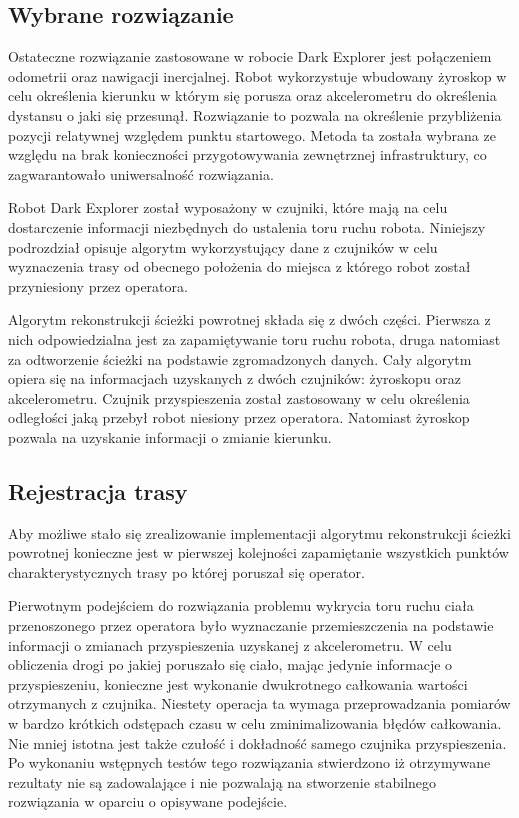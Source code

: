 \subsection{Wybrane rozwiązanie}
Ostateczne rozwiązanie zastosowane w robocie Dark Explorer jest połączeniem odometrii oraz nawigacji inercjalnej. Robot wykorzystuje wbudowany żyroskop w celu określenia kierunku w którym się porusza oraz akcelerometru do określenia dystansu o jaki się przesunął. Rozwiązanie to pozwala na określenie przybliżenia pozycji relatywnej względem punktu startowego. Metoda ta została wybrana ze względu na brak konieczności przygotowywania zewnętrznej infrastruktury, co zagwarantowało uniwersalność rozwiązania.

Robot Dark Explorer został wyposażony w czujniki, które mają na celu dostarczenie
informacji niezbędnych do ustalenia toru ruchu robota. Niniejszy podrozdział
opisuje algorytm wykorzystujący dane z czujników w celu wyznaczenia trasy od
obecnego położenia do miejsca z którego robot został przyniesiony przez
operatora.

Algorytm rekonstrukcji ścieżki powrotnej składa się z dwóch części. Pierwsza z
nich odpowiedzialna jest za zapamiętywanie toru ruchu robota, druga natomiast za
odtworzenie ścieżki na podstawie zgromadzonych danych. Cały algorytm opiera się
na informacjach uzyskanych z dwóch czujników: żyroskopu oraz akcelerometru.
Czujnik przyspieszenia został zastosowany w celu określenia odległości jaką
przebył robot niesiony przez operatora. Natomiast żyroskop pozwala na uzyskanie
informacji o zmianie kierunku.

\subsection{Rejestracja trasy}
Aby możliwe stało się zrealizowanie implementacji algorytmu rekonstrukcji
ścieżki powrotnej konieczne jest w pierwszej kolejności zapamiętanie wszystkich
punktów charakterystycznych trasy po której poruszał się operator.

Pierwotnym podejściem do rozwiązania problemu wykrycia toru ruchu ciała
przenoszonego przez operatora było wyznaczanie przemieszczenia na
podstawie informacji o zmianach przyspieszenia uzyskanej z akcelerometru.
W celu obliczenia drogi po jakiej poruszało się ciało, mając jedynie informacje 
o przyspieszeniu, konieczne jest wykonanie dwukrotnego całkowania wartości 
otrzymanych z czujnika. Niestety operacja ta wymaga przeprowadzania pomiarów w
bardzo krótkich odstępach czasu w celu zminimalizowania błędów całkowania.
Nie mniej istotna jest także czułość i dokładność samego czujnika
przyspieszenia. Po wykonaniu wstępnych testów tego rozwiązania stwierdzono iż
otrzymywane rezultaty nie są zadowalające  i nie pozwalają na stworzenie
stabilnego rozwiązania w oparciu o opisywane podejście. 

